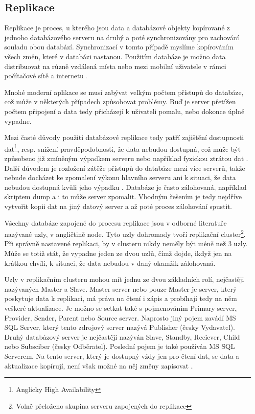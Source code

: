         \subsection{Replikace}

        Replikace je proces, u kterého jsou data a databázové objekty kopírované z
        jednoho databázového serveru na druhý a poté synchronizovány pro zachování
        souladu obou databází. Synchronizací v tomto případě myslíme kopírováním všech
        změn, které v databázi nastanou. Použitím databáze je možno data distribuovat
        na různě vzdálená místa nebo mezi mobilní uživatele v rámci počítačové sítě a
        internetu \citep{Microsoft2013}.

        Mnohé moderní aplikace se musí zabývat velkým počtem přístupů do databáze, což
        může v některých případech způsobovat problémy. Buď je server přetížen počtem
        připojení a data tedy přicházejí k uživateli pomalu, nebo dokonce úplně
        vypadne. 

        Mezi časté důvody použití databázové replikace tedy patří zajištění dostupnosti
        dat\footnote{Anglicky High Availability}, resp. snížení pravděpodobnosti, že
        data nebudou dostupná, což může být způsobeno již zmíněným výpadkem serveru
        nebo například fyzickou ztrátou dat \citep{ObeHsu2012}. Další důvodem je
        rozložení zátěže přístupů do databáze mezi více serverů, takže nebude docházet
        ke zpomalení výkonu hlavního serveru ani k situaci, že data nebudou dostupná
        kvůli jeho výpadku \citep{BellKindahlThalmann2010}. Databáze je často
        zálohovaná, například skriptem dump a i to může server zpomalit. Vhodným
        řešením je tedy nejdříve vytvořit kopii dat na jiný datový server a až poté
        proces zálohování spustit. 

        Všechny databáze zapojené do procesu replikace jsou v odborné literatuře
        nazývané uzly, v angličtině node. Tyto uzly dohromady tvoří replikační
        cluster\footnote{Volně přeloženo skupina serveru zapojených do replikace}. Při
        správně nastavené replikaci, by v clusteru nikdy neměly být méně než 3 uzly.
        Může se totiž stát, že vypadne jeden ze dvou uzlů, čímž dojde, ikdyž jen na
        krátkou chvíli, k situaci, že data nebudou v daný okamžik zálohovaná. 

        Uzly v replikačním clusteru mohou mít jednu ze dvou základních rolí, nejčastěji
        nazývaných Master a Slave. Master server nebo pouze Master je server, který
        poskytuje data k replikaci, má práva na čtení i zápis a probíhají tedy na něm
        veškeré aktualizace. Je možno se setkat také s pojmenováním Primary server,
        Provider, Sender, Parent nebo Source server. Naprosto jiný pojem zavádí MS SQL
        Server, který tento zdrojový server nazývá Publisher (česky Vydavatel). Druhý
        databázový server je nejčastěji nazýván Slave, Standby, Reciever, Child nebo
        Subsciber (česky Odběratel). Poslední pojem je také používán MS SQL Serverem.
        Na tento server, který je dostupný vždy jen pro čtení dat, se data a
        aktualizace kopírují, není však možné na něj změny zapisovat
        \citep{RiggsKrossing2010}.

